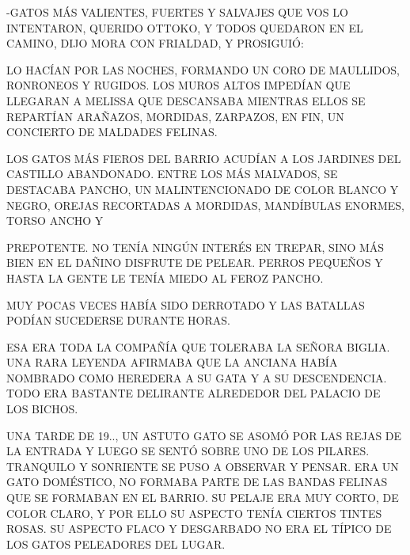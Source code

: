 -GATOS MÁS VALIENTES, FUERTES Y SALVAJES QUE VOS LO INTENTARON, QUERIDO OTTOKO, Y TODOS QUEDARON EN EL CAMINO, DIJO MORA CON FRIALDAD, Y PROSIGUIÓ:

LO HACÍAN POR LAS NOCHES, FORMANDO UN CORO DE MAULLIDOS, RONRONEOS Y RUGIDOS. LOS MUROS ALTOS IMPEDÍAN QUE LLEGARAN A MELISSA QUE DESCANSABA MIENTRAS ELLOS SE REPARTÍAN ARAÑAZOS, MORDIDAS, ZARPAZOS, EN FIN, UN CONCIERTO DE MALDADES FELINAS.

LOS GATOS MÁS FIEROS DEL BARRIO ACUDÍAN A LOS JARDINES DEL CASTILLO ABANDONADO. ENTRE LOS MÁS MALVADOS, SE DESTACABA PANCHO, UN MALINTENCIONADO DE COLOR BLANCO Y NEGRO, OREJAS RECORTADAS A MORDIDAS, MANDÍBULAS ENORMES, TORSO ANCHO Y 

\newpage
{}
PREPOTENTE. NO TENÍA NINGÚN INTERÉS EN TREPAR, SINO MÁS BIEN EN EL DAÑINO DISFRUTE DE PELEAR. PERROS PEQUEÑOS Y HASTA LA GENTE LE TENÍA MIEDO AL FEROZ PANCHO. 
\begin{flushright}
	\begin{minipage}[r]{.56\textwidth}
		MUY POCAS  VECES HABÍA SIDO  DERROTADO Y LAS BATALLAS PODÍAN SUCEDERSE DURANTE HORAS.
		
		ESA ERA TODA LA COMPAÑÍA QUE TOLERABA LA SEÑORA BIGLIA. UNA RARA LEYENDA AFIRMABA QUE LA ANCIANA HABÍA NOMBRADO COMO HEREDERA A SU GATA Y A SU DESCENDENCIA. TODO ERA BASTANTE DELIRANTE ALREDEDOR DEL PALACIO DE LOS BICHOS.
	\end{minipage}
\end{flushright}



\newpage
{}
UNA TARDE DE 19.., UN ASTUTO GATO SE ASOMÓ POR LAS REJAS DE LA ENTRADA Y LUEGO SE SENTÓ SOBRE UNO DE LOS PILARES. TRANQUILO Y SONRIENTE SE PUSO A OBSERVAR Y PENSAR. ERA UN GATO DOMÉSTICO, NO FORMABA PARTE DE LAS BANDAS FELINAS QUE SE FORMABAN EN EL BARRIO. SU PELAJE ERA MUY CORTO,  DE COLOR  CLARO, Y POR ELLO SU ASPECTO TENÍA CIERTOS  TINTES ROSAS.  SU ASPECTO FLACO Y DESGARBADO NO ERA EL TÍPICO DE LOS GATOS PELEADORES DEL LUGAR.

